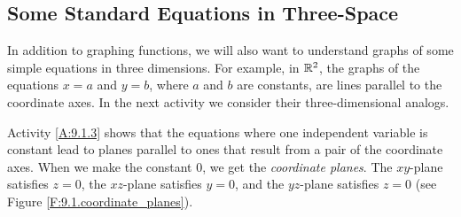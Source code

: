 \vspace{10pt}

\subsection*{Some Standard Equations in Three-Space}

In addition to graphing functions, we will also want to understand
graphs of some simple equations in three dimensions. For example, in
$\mathbb{R}^2$, the graphs of the equations $x=a$ and $y=b$, where $a$ and $b$
are constants, are lines parallel to the coordinate axes. In the next
activity we consider their three-dimensional analogs.



Activity \ref{A:9.1.3} shows that the equations where one independent
variable is constant lead to planes parallel to ones that result from
a pair of the coordinate axes. When we make the constant 0, we get the
\emph{coordinate planes}. The $xy$-plane
satisfies $z=0$, the $xz$-plane satisfies $y=0$, and the $yz$-plane
satisfies $z=0$ (see Figure \ref{F:9.1.coordinate_planes}).

